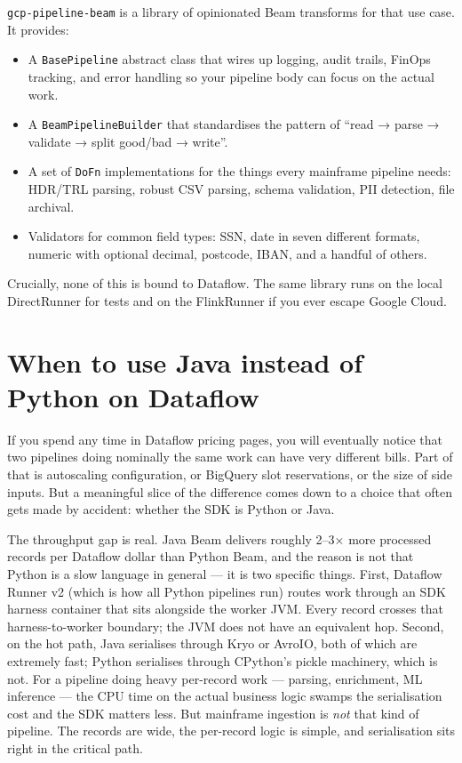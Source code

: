 \documentclass[
  11pt,
  british,
  oneside]{book}
\providecommand{\tightlist}{%
  \setlength{\itemsep}{0pt}\setlength{\parskip}{0pt}}
\begin{document}
\texttt{gcp-pipeline-beam} is a library of
opinionated Beam transforms for that use case. It provides:

\begin{itemize}
\tightlist
\item
  A \texttt{BasePipeline} abstract class that wires up logging, audit
  trails, FinOps tracking, and error handling so your pipeline body can
  focus on the actual work.
\item
  A \texttt{BeamPipelineBuilder} that standardises the pattern of ``read
  → parse → validate → split good/bad → write''.
\item
  A set of \texttt{DoFn} implementations for the things every mainframe
  pipeline needs: HDR/TRL parsing, robust CSV parsing, schema
  validation, PII detection, file archival.
\item
  Validators for common field types: SSN, date in seven different
  formats, numeric with optional decimal, postcode, IBAN, and a handful
  of others.
\end{itemize}

Crucially, none of this is bound to Dataflow. The same library runs on
the local DirectRunner for tests and on the FlinkRunner if you ever
escape Google Cloud.

\hypertarget{when-to-use-java-instead-of-python-on-dataflow}{%
\section{When to use Java instead of Python on
Dataflow}\label{when-to-use-java-instead-of-python-on-dataflow}}

If you spend any time in Dataflow pricing pages, you will eventually
notice that two pipelines doing nominally the same work can have very
different bills. Part of that is autoscaling configuration, or BigQuery
slot reservations, or the size of side inputs. But a meaningful slice of
the difference comes down to a choice that often gets made by accident:
whether the SDK is Python or Java.

The throughput gap is real. Java Beam delivers roughly 2--3× more
processed records per Dataflow dollar than Python Beam, and the reason
is not that Python is a slow language in general --- it is two specific
things. First, Dataflow Runner v2 (which is how all Python pipelines
run) routes work through an SDK harness container that sits alongside
the worker JVM. Every record crosses that harness-to-worker boundary;
the JVM does not have an equivalent hop. Second, on the hot path, Java
serialises through Kryo or AvroIO, both of which are extremely fast;
Python serialises through CPython's pickle machinery, which is not. For
a pipeline doing heavy per-record work --- parsing, enrichment, ML
inference --- the CPU time on the actual business logic swamps the
serialisation cost and the SDK matters less. But mainframe ingestion is
\emph{not} that kind of pipeline. The records are wide, the per-record
logic is simple, and serialisation sits right in the critical path.
\end{document}
